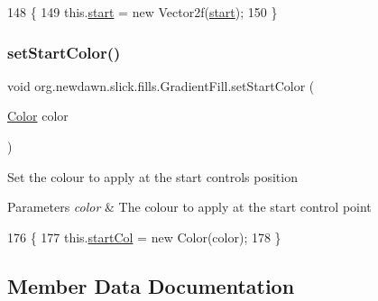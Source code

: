\begin{DoxyCode}
148                                          \{
149         this.\mbox{\hyperlink{classorg_1_1newdawn_1_1slick_1_1fills_1_1_gradient_fill_ae0e8a44c266db0e41cd213938c031ced}{start}} = \textcolor{keyword}{new} Vector2f(\mbox{\hyperlink{classorg_1_1newdawn_1_1slick_1_1fills_1_1_gradient_fill_ae0e8a44c266db0e41cd213938c031ced}{start}});
150     \}
\end{DoxyCode}
\mbox{\label{classorg_1_1newdawn_1_1slick_1_1fills_1_1_gradient_fill_a6b04f30b54b25a86699e3b802a70d3a6}} 
\subsubsection{\texorpdfstring{set\+Start\+Color()}{setStartColor()}}
{\footnotesize\ttfamily void org.\+newdawn.\+slick.\+fills.\+Gradient\+Fill.\+set\+Start\+Color (\begin{DoxyParamCaption}\item[{\mbox{\hyperlink{classorg_1_1newdawn_1_1slick_1_1_color}{Color}}}]{color }\end{DoxyParamCaption})\hspace{0.3cm}{\ttfamily [inline]}}

Set the colour to apply at the start control\textquotesingle{}s position


\begin{DoxyParams}{Parameters}
{\em color} & The colour to apply at the start control point \\
\hline
\end{DoxyParams}

\begin{DoxyCode}
176                                            \{
177         this.\mbox{\hyperlink{classorg_1_1newdawn_1_1slick_1_1fills_1_1_gradient_fill_a7d7a0f4539c16030b77f9b8dc06a5509}{startCol}} = \textcolor{keyword}{new} Color(color);
178     \}
\end{DoxyCode}


\subsection{Member Data Documentation}
\mbox{\label{classorg_1_1newdawn_1_1slick_1_1fills_1_1_gradient_fill_ad061e535f20522d5170bfad1354480c6}} 
